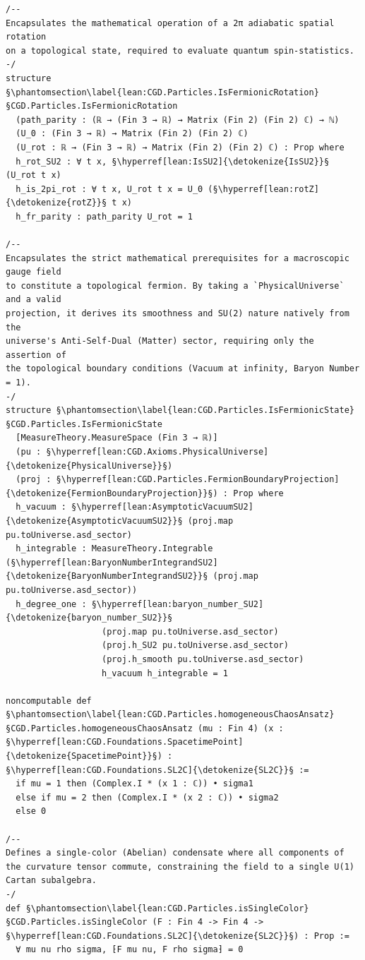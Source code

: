 \begin{verbatim}
/--
Encapsulates the mathematical operation of a 2π adiabatic spatial rotation 
on a topological state, required to evaluate quantum spin-statistics.
-/
structure §\phantomsection\label{lean:CGD.Particles.IsFermionicRotation}§CGD.Particles.IsFermionicRotation
  (path_parity : (ℝ → (Fin 3 → ℝ) → Matrix (Fin 2) (Fin 2) ℂ) → ℕ)
  (U_0 : (Fin 3 → ℝ) → Matrix (Fin 2) (Fin 2) ℂ)
  (U_rot : ℝ → (Fin 3 → ℝ) → Matrix (Fin 2) (Fin 2) ℂ) : Prop where
  h_rot_SU2 : ∀ t x, §\hyperref[lean:IsSU2]{\detokenize{IsSU2}}§ (U_rot t x)
  h_is_2pi_rot : ∀ t x, U_rot t x = U_0 (§\hyperref[lean:rotZ]{\detokenize{rotZ}}§ t x)
  h_fr_parity : path_parity U_rot = 1

/--
Encapsulates the strict mathematical prerequisites for a macroscopic gauge field 
to constitute a topological fermion. By taking a `PhysicalUniverse` and a valid 
projection, it derives its smoothness and SU(2) nature natively from the 
universe's Anti-Self-Dual (Matter) sector, requiring only the assertion of 
the topological boundary conditions (Vacuum at infinity, Baryon Number = 1).
-/
structure §\phantomsection\label{lean:CGD.Particles.IsFermionicState}§CGD.Particles.IsFermionicState
  [MeasureTheory.MeasureSpace (Fin 3 → ℝ)]
  (pu : §\hyperref[lean:CGD.Axioms.PhysicalUniverse]{\detokenize{PhysicalUniverse}}§)
  (proj : §\hyperref[lean:CGD.Particles.FermionBoundaryProjection]{\detokenize{FermionBoundaryProjection}}§) : Prop where
  h_vacuum : §\hyperref[lean:AsymptoticVacuumSU2]{\detokenize{AsymptoticVacuumSU2}}§ (proj.map pu.toUniverse.asd_sector)
  h_integrable : MeasureTheory.Integrable (§\hyperref[lean:BaryonNumberIntegrandSU2]{\detokenize{BaryonNumberIntegrandSU2}}§ (proj.map pu.toUniverse.asd_sector))
  h_degree_one : §\hyperref[lean:baryon_number_SU2]{\detokenize{baryon_number_SU2}}§ 
                   (proj.map pu.toUniverse.asd_sector) 
                   (proj.h_SU2 pu.toUniverse.asd_sector) 
                   (proj.h_smooth pu.toUniverse.asd_sector) 
                   h_vacuum h_integrable = 1

noncomputable def §\phantomsection\label{lean:CGD.Particles.homogeneousChaosAnsatz}§CGD.Particles.homogeneousChaosAnsatz (mu : Fin 4) (x : §\hyperref[lean:CGD.Foundations.SpacetimePoint]{\detokenize{SpacetimePoint}}§) : §\hyperref[lean:CGD.Foundations.SL2C]{\detokenize{SL2C}}§ :=
  if mu = 1 then (Complex.I * (x 1 : ℂ)) • sigma1
  else if mu = 2 then (Complex.I * (x 2 : ℂ)) • sigma2
  else 0

/--
Defines a single-color (Abelian) condensate where all components of the curvature tensor commute, constraining the field to a single U(1) Cartan subalgebra.
-/
def §\phantomsection\label{lean:CGD.Particles.isSingleColor}§CGD.Particles.isSingleColor (F : Fin 4 -> Fin 4 -> §\hyperref[lean:CGD.Foundations.SL2C]{\detokenize{SL2C}}§) : Prop :=
  ∀ mu nu rho sigma, ⁅F mu nu, F rho sigma⁆ = 0


\end{verbatim}
